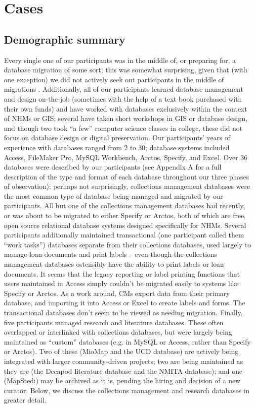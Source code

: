 \section{Cases}

\subsection{Demographic summary}

Every single one of our participants was in the middle of, or preparing for, a database migration of some sort; this was somewhat surprising, given that (with one exception) we did not actively seek out participants in the middle of migrations . Additionally, all of our participants learned database management and design on-the-job (sometimes with the help of a text book purchased with their own funds) and have worked with databases exclusively within the context of NHMs or GIS; several have taken short workshops in GIS or database design, and though two took “a few” computer science classes in college, these did not focus on database design or digital preservation. Our participants’ years of experience with databases ranged from 2 to 30; database systems included Access, FileMaker Pro, MySQL Workbench, Arctos, Specify, and Excel.
Over 36 databases were described by our participants (see Appendix A for a full description of the type and format of each database throughout our three phases of observation); perhaps not surprisingly, collections management databases were the most common type of database being managed and migrated by our participants. All but one of the collections management databases had recently, or was about to be migrated to either Specify or Arctos, both of which are free, open source relational database systems designed specifically for NHMs. Several participants additionally maintained transactional (one participant called them “work tasks”) databases separate from their collections databases, used largely to manage loan documents and print labels – even though the collections management databases ostensibly have the ability to print labels or loan documents. It seems that the legacy reporting or label printing functions that users maintained in Access simply couldn’t be migrated easily to systems like Specify or Arctos. As a work around, CMs export data from their primary database, and importing it into Access or Excel to create labels and forms. The transactional databases don’t seem to be viewed as needing migration. Finally, five participants managed research and literature databases. These often overlapped or interlinked with collections databases, but were largely being maintained as “custom” databases (e.g. in MySQL or Access, rather than Specify or Arctos). Two of these (MioMap and the UCD database) are actively being integrated with larger community-driven projects; two are being maintained as they are (the Decapod literature database and the NMITA database); and one (MapStedi) may be archived as it is, pending the hiring and decision of a new curator.  Below, we discuss the collections management and research databases in greater detail.

